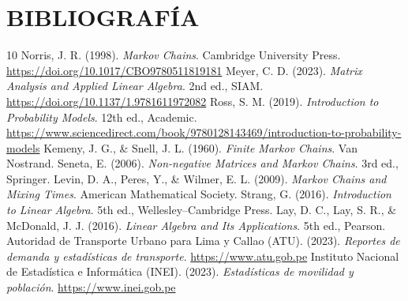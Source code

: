 \documentclass[12pt]{article}
\begin{document}
\section{BIBLIOGRAFÍA}
\begin{thebibliography}{10}
     Norris, J. R. (1998). \emph{Markov Chains}. Cambridge University Press. \url{https://doi.org/10.1017/CBO9780511819181}
     Meyer, C. D. (2023). \emph{Matrix Analysis and Applied Linear Algebra}. 2nd ed., SIAM. \url{https://doi.org/10.1137/1.9781611972082}
     Ross, S. M. (2019). \emph{Introduction to Probability Models}. 12th ed., Academic. \url{https://www.sciencedirect.com/book/9780128143469/introduction-to-probability-models}
     Kemeny, J. G., \& Snell, J. L. (1960). \emph{Finite Markov Chains}. Van Nostrand.
     Seneta, E. (2006). \emph{Non-negative Matrices and Markov Chains}. 3rd ed., Springer.
     Levin, D. A., Peres, Y., \& Wilmer, E. L. (2009). \emph{Markov Chains and Mixing Times}. American Mathematical Society.
     Strang, G. (2016). \emph{Introduction to Linear Algebra}. 5th ed., Wellesley--Cambridge Press.
     Lay, D. C., Lay, S. R., \& McDonald, J. J. (2016). \emph{Linear Algebra and Its Applications}. 5th ed., Pearson.
     Autoridad de Transporte Urbano para Lima y Callao (ATU). (2023). \emph{Reportes de demanda y estadísticas de transporte}. \url{https://www.atu.gob.pe}
     Instituto Nacional de Estadística e Informática (INEI). (2023). \emph{Estadísticas de movilidad y población}. \url{https://www.inei.gob.pe}
\end{thebibliography}
\end{document}
